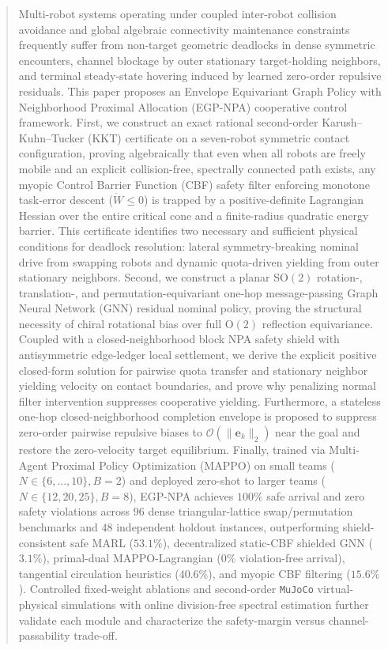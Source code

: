 \documentclass[journal]{IEEEtran}
\begin{document}
\begin{abstract}
Multi-robot systems operating under coupled inter-robot collision avoidance and global algebraic connectivity maintenance constraints frequently suffer from non-target geometric deadlocks in dense symmetric encounters, channel blockage by outer stationary target-holding neighbors, and terminal steady-state hovering induced by learned zero-order repulsive residuals. This paper proposes an Envelope Equivariant Graph Policy with Neighborhood Proximal Allocation (EGP-NPA) cooperative control framework. First, we construct an exact rational second-order Karush--Kuhn--Tucker (KKT) certificate on a seven-robot symmetric contact configuration, proving algebraically that even when all robots are freely mobile and an explicit collision-free, spectrally connected path exists, any myopic Control Barrier Function (CBF) safety filter enforcing monotone task-error descent ($\dot{W}\le 0$) is trapped by a positive-definite Lagrangian Hessian over the entire critical cone and a finite-radius quadratic energy barrier. This certificate identifies two necessary and sufficient physical conditions for deadlock resolution: lateral symmetry-breaking nominal drive from swapping robots and dynamic quota-driven yielding from outer stationary neighbors. Second, we construct a planar $\mathrm{SO}(2)$ rotation-, translation-, and permutation-equivariant one-hop message-passing Graph Neural Network (GNN) residual nominal policy, proving the structural necessity of chiral rotational bias over full $\mathrm{O}(2)$ reflection equivariance. Coupled with a closed-neighborhood block NPA safety shield with antisymmetric edge-ledger local settlement, we derive the explicit positive closed-form solution for pairwise quota transfer and stationary neighbor yielding velocity on contact boundaries, and prove why penalizing normal filter intervention suppresses cooperative yielding. Furthermore, a stateless one-hop closed-neighborhood completion envelope is proposed to suppress zero-order pairwise repulsive biases to $\mathcal{O}(\lVert\boldsymbol{e}_k\rVert_2)$ near the goal and restore the zero-velocity target equilibrium. Finally, trained via Multi-Agent Proximal Policy Optimization (MAPPO) on small teams ($N\in\{6,\dots,10\}, B=2$) and deployed zero-shot to larger teams ($N\in\{12,20,25\}, B=8$), EGP-NPA achieves $100\%$ safe arrival and zero safety violations across $96$ dense triangular-lattice swap/permutation benchmarks and $48$ independent holdout instances, outperforming shield-consistent safe MARL ($53.1\%$), decentralized static-CBF shielded GNN ($3.1\%$), primal-dual MAPPO-Lagrangian ($0\%$ violation-free arrival), tangential circulation heuristics ($40.6\%$), and myopic CBF filtering ($15.6\%$). Controlled fixed-weight ablations and second-order \texttt{MuJoCo} virtual-physical simulations with online division-free spectral estimation further validate each module and characterize the safety-margin versus channel-passability trade-off.
\end{abstract}
\end{document}
